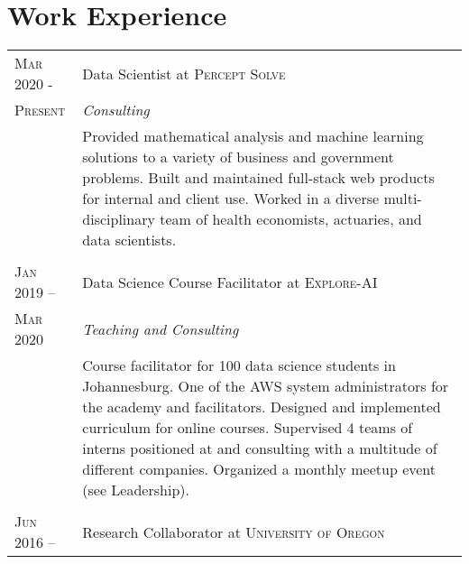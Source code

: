 \section{Work Experience}

\begin{supertabular}{p{1.8cm}|p{12cm}}
	\textsc{Mar 2020 -}  		& Data Scientist at \textsc{Percept Solve} \\
	\textsc{Present}			& \emph{Consulting} \\
								& \footnotesize{Provided mathematical analysis and machine learning solutions to a variety of business and government problems. Built and maintained full-stack web products for internal and client use. Worked in a diverse multi-disciplinary team of health economists, actuaries, and data scientists.} \\
	 \\
	\textsc{Jan 2019 --}  		& Data Science Course Facilitator at \textsc{Explore-AI} \\
	\textsc{Mar 2020}			& \emph{Teaching and Consulting} \\
								& \footnotesize{Course facilitator for 100 data science students in Johannesburg. One of the AWS system administrators for the academy and facilitators. Designed and implemented curriculum for online courses. Supervised 4 teams of interns positioned at and consulting with a multitude of different companies. Organized a monthly meetup event (see Leadership).} \\
	 \\
	\textsc{Jun 2016 --}    	& Research Collaborator at \textsc{University of Oregon} \\

\end{supertabular}
